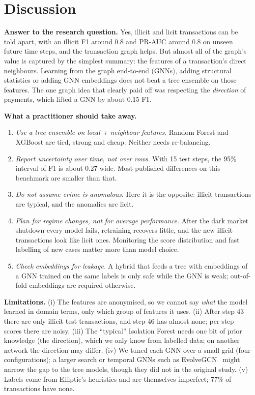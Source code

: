 \section{Discussion}

\textbf{Answer to the research question.} Yes, illicit and licit transactions
can be told apart, with an illicit F1 around 0.8 and PR-AUC around 0.8 on unseen
future time steps, and the transaction graph helps. But almost all of the graph's
value is captured by the simplest summary: the features of a transaction's direct
neighbours. Learning from the graph end-to-end (GNNs), adding structural
statistics or adding GNN embeddings does not beat a tree ensemble on those
features. The one graph idea that clearly paid off was respecting the
\emph{direction} of payments, which lifted a GNN by about 0.15 F1.

\textbf{What a practitioner should take away.}
\begin{enumerate}
  \item \emph{Use a tree ensemble on local + neighbour features.} Random Forest
        and XGBoost are tied, strong and cheap. Neither needs re-balancing.
  \item \emph{Report uncertainty over time, not over rows.} With 15 test steps,
        the 95\% interval of F1 is about 0.27 wide. Most published differences on
        this benchmark are smaller than that.
  \item \emph{Do not assume crime is anomalous.} Here it is the opposite:
        illicit transactions are typical, and the anomalies are licit.
  \item \emph{Plan for regime changes, not for average performance.} After the
        dark market shutdown every model fails, retraining recovers little, and
        the new illicit transactions look like licit ones. Monitoring the score
        distribution and fast labelling of new cases matter more than model
        choice.
  \item \emph{Check embeddings for leakage.} A hybrid that feeds a tree with
        embeddings of a GNN trained on the same labels is only safe while the GNN
        is weak; out-of-fold embeddings are required otherwise.
\end{enumerate}

\textbf{Limitations.}
(i) The features are anonymised, so we cannot say \emph{what} the model learned
in domain terms, only which group of features it uses.
(ii) After step 43 there are only \EdaIllicitPost{} illicit test transactions,
and step 46 has almost none; per-step scores there are noisy.
(iii) The ``typical'' Isolation Forest needs one bit of prior knowledge (the
direction), which we only know from labelled data; on another network the
direction may differ.
(iv) We tuned each GNN over a small grid (four configurations); a larger search
or temporal GNNs such as EvolveGCN~\cite{pareja2020} might narrow the gap to the
tree models, though they did not in the original study.
(v) Labels come from Elliptic's heuristics and are themselves imperfect; 77\% of
transactions have none.


